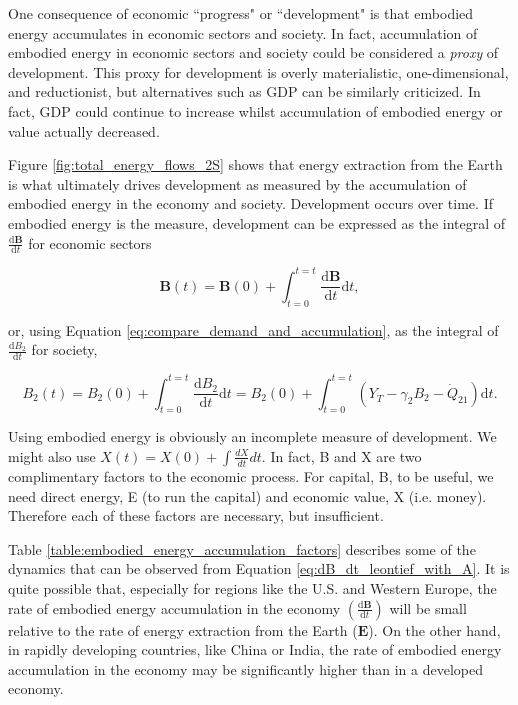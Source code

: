 \documentclass[authoryear,preprint,review,12pt]{elsarticle}
\renewcommand{\vec}[1]{\mathbf{#1}}
\begin{document}
One consequence of economic ``progress" or ``development" is that embodied energy accumulates in economic sectors and society. In fact, accumulation of embodied energy in economic sectors and society could be considered a \emph{proxy} of development. This proxy for development is overly materialistic, one-dimensional, and reductionist, but alternatives such as GDP can be similarly criticized. In fact, GDP could continue to increase whilst accumulation of embodied energy or value actually decreased.

Figure \ref{fig:total_energy_flows_2S} shows that energy extraction from the Earth is what ultimately drives development as measured by the accumulation of embodied energy in the economy and society. Development occurs over time. If embodied energy is the measure, development can be expressed as the integral of $\frac{\mathrm{d}\vec{B}}{\mathrm{d}t}$ for economic sectors

\begin{equation} \label{eq:Dev_Integral_Economy}
	\vec{B}(t) = \vec{B}(0) + \int_{t=0}^{t=t} \frac{\mathrm{d}\vec{B}}{\mathrm{d}t}\mathrm{d}t,
\end{equation}

\noindent or, using Equation \ref{eq:compare_demand_and_accumulation}, as the integral of $\frac{\mathrm{d}B_{2}}{\mathrm{d}t}$ for society,

\begin{equation} \label{eq:Dev_Integral_Society}
	B_{2}(t) = B_{2}(0) + \int_{t=0}^{t=t} \frac{\mathrm{d}B_{2}}{\mathrm{d}t}\mathrm{d}t = B_{2}(0) + \int_{t=0}^{t=t} (Y_{\dot{T}} - \gamma_{2}B_{2} - \dot{Q}_{21})\mathrm{d}t.
\end{equation}


Using embodied energy is obviously an incomplete measure of development. We might also use $X(t) = X(0) + \int\frac{dX}{dt}dt$. In fact, B and X are two complimentary factors to the economic process. For capital, B, to be useful, we need direct energy, E (to run the capital) and economic value, X (i.e. money). Therefore each of these factors are necessary, but insufficient.

Table \ref{table:embodied_energy_accumulation_factors} describes some of the dynamics that can be observed from Equation \ref{eq:dB_dt_leontief_with_A}. It is quite possible that, especially for regions like the U.S. and Western Europe, the rate of embodied energy accumulation in the economy $\left(\frac{\mathrm{d}\vec{B}}{\mathrm{d}t}\right)$ will be small relative to the rate of energy extraction from the Earth ($\vec{E}$). On the other hand, in rapidly developing countries, like China or India, the rate of embodied energy accumulation in the economy may be significantly higher than in a developed economy.
\end{document}
